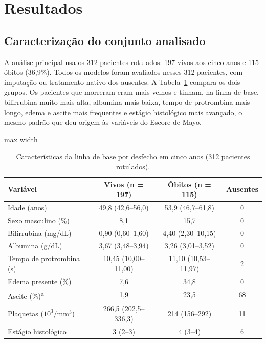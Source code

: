 \section{Resultados}\label{sec:resultados}

\subsection{Caracterização do conjunto analisado}
A análise principal usa os 312 pacientes rotulados: 197 vivos aos cinco anos e 115 óbitos (36,9\%). Todos os modelos foram avaliados nesses 312 pacientes, com imputação ou tratamento nativo dos ausentes. A Tabela~\ref{tab:caracterizacao} compara os dois grupos. Os pacientes que morreram eram mais velhos e tinham, na linha de base, bilirrubina muito mais alta, albumina mais baixa, tempo de protrombina mais longo, edema e ascite mais frequentes e estágio histológico mais avançado, o mesmo padrão que deu origem às variáveis do Escore de Mayo.

\begin{table}[htbp]
\centering
\caption{Características da linha de base por desfecho em cinco anos (312 pacientes rotulados).}
\label{tab:caracterizacao}
\small
\renewcommand{\arraystretch}{1.12}
\begin{adjustbox}{max width=\linewidth}
\begin{tabular}{@{}lccc@{}}
\toprule
\textbf{Variável} & \textbf{Vivos (n = 197)} & \textbf{Óbitos (n = 115)} & \textbf{Ausentes} \\
\midrule
Idade (anos) & 49,8 (42,6--56,0) & 53,9 (46,7--61,8) & 0 \\
Sexo masculino (\%) & 8,1 & 15,7 & 0 \\
Bilirrubina (mg/dL) & 0,90 (0,60--1,60) & 4,40 (2,30--10,15) & 0 \\
Albumina (g/dL) & 3,67 (3,48--3,94) & 3,26 (3,01--3,52) & 0 \\
Tempo de protrombina (s) & 10,45 (10,00--11,00) & 11,10 (10,53--11,97) & 2 \\
Edema presente (\%) & 7,6 & 34,8 & 0 \\
Ascite (\%)\textsuperscript{a} & 1,9 & 23,5 & 68 \\
Plaquetas ($10^3$/mm$^3$) & 266,5 (202,5--336,3) & 214 (156--292) & 11 \\
Estágio histológico & 3 (2--3) & 4 (3--4) & 6 \\
\bottomrule
\end{tabular}
\end{adjustbox}
\par{}
\end{table}

